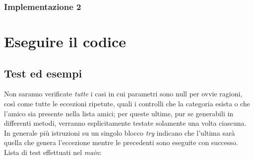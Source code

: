 \documentclass[10pt, a4paper]{article}
\begin{document}
\subsubsection{Implementazione 2}



\clearpage
\section{Eseguire il codice}
\subsection{Test ed esempi}
Non saranno verificate \textit{tutte} i casi in cui parametri sono null per ovvie ragioni, così come tutte le eccezioni ripetute, quali i controlli che la categoria esista o che l'amico sia presente nella lista amici; per queste ultime, pur se generabili in differenti metodi, verranno esplicitamente testate solamente una volta ciascuna. In generale più istruzioni su un singolo blocco \textit{try} indicano che l'ultima sarà quella che genera l'eccezione mentre le precedenti sono eseguite con successo.\\
Lista di test effettuati nel \textit{main}:
\end{document}
